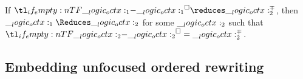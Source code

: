 
\begin{theorem}
  If $\embed{\octx_1} \reduces \np{\octx}_2$, then $\octx_1 \Reduces \octx_2$ for some $\__logic_octx:_2$ such that $\embed{\octx_2} = \np{\octx}_2$.
\end{theorem}

\subsection{Embedding unfocused ordered rewriting}

